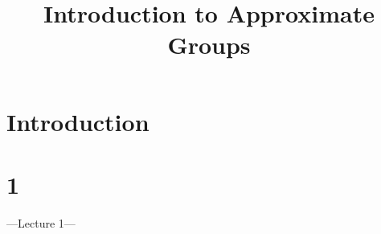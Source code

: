 \documentclass[a4paper]{article}
\begin{document}
\title{Introduction to Approximate Groups}

\maketitle

\newpage

\tableofcontents

\newpage

\section{Introduction}

\newpage

\section{1}

---Lecture 1---
\end{document}
